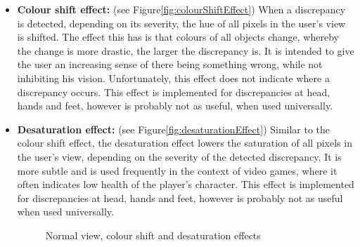 \begin{itemize}
    \item \textbf{Colour shift effect:} (see Figure\autoref{fig:colourShiftEffect})
    \newline
    When a discrepancy is detected, depending on its severity, the hue of all pixels in the user's view is shifted. The effect this has is that colours of all objects change, whereby the change is more drastic, the larger the discrepancy is. It is intended to give the user an increasing sense of there being something wrong, while not inhibiting his vision. Unfortunately, this effect does not indicate where a discrepancy occurs.
    \newline
    This effect is implemented for discrepancies at head, hands and feet, however is probably not as useful, when used universally.
    
    
    \item \textbf{Desaturation effect:} (see Figure\autoref{fig:desaturationEffect})
    \newline
    Similar to the colour shift effect, the desaturation effect lowers the saturation of all pixels in the user's view, depending on the severity of the detected discrepancy. It is more subtle and is used frequently in the context of video games, where it often indicates low health of the player's character.
    \newline
    This effect is implemented for discrepancies at head, hands and feet, however is probably not as useful when used universally.
    
    \begin{figure} [h]
        \centering
        \hfill
        \hfill
        \caption{Normal view, colour shift and desaturation effects}
        \label{fig:normalColourDesaturation}
    \end{figure}
    
    
\end{itemize}


